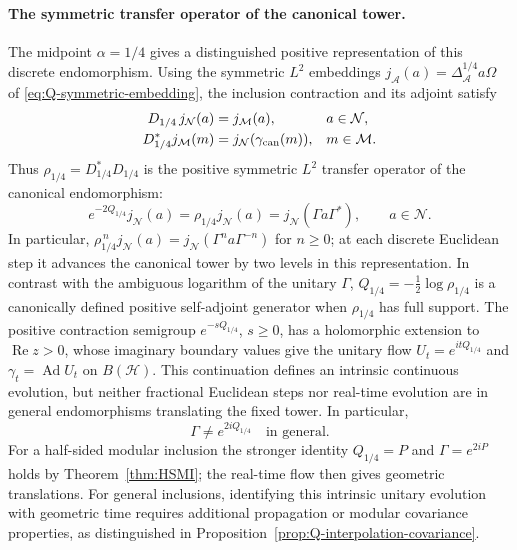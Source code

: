 \documentclass[a4paper,11pt]{article}
\theoremstyle{definition}
\newcommand{\mA}{\mathcal{A}}%
\newcommand{\mN}{\mathcal{N}}
\newcommand{\mH}{\mathcal{H}}
\newcommand{\mM}{\mathcal{M}}
\begin{document}
\paragraph{The symmetric transfer operator of the canonical tower.}
The midpoint $\alpha=1/4$ gives a distinguished positive representation
of this discrete endomorphism. Using the symmetric $L^2$ embeddings
$j_{\mA}(a)=\Delta_{\mA}^{1/4}a\Omega$ of
\eqref{eq:Q-symmetric-embedding}, the inclusion contraction and its
adjoint satisfy
\begin{equation}
 \begin{aligned}
 D_{1/4}\,j_{\mN}(a)&=j_{\mM}(a),&&a\in\mN,\\
 D_{1/4}^*j_{\mM}(m)&=j_{\mN}(\gamma_{\rm can}(m)),&&m\in\mM.
 \end{aligned}
 \label{eq:canonical-L2-adjoint}
\end{equation}
Thus $\rho_{1/4}=D_{1/4}^*D_{1/4}$ is the positive symmetric
$L^2$ transfer operator of the canonical endomorphism:
\begin{equation}
 \boxed{\quad
 e^{-2Q_{1/4}}j_{\mN}(a)
 =\rho_{1/4}j_{\mN}(a)
 =j_{\mN}(\Gamma a\Gamma^*),\qquad a\in\mN.\quad}
 \label{eq:canonical-L2-transfer}
\end{equation}
In particular, $\rho_{1/4}^{\,n}j_{\mN}(a)
=j_{\mN}(\Gamma^n a\Gamma^{-n})$ for $n\geq0$; at each discrete
Euclidean step it advances the canonical tower by two levels in this
representation. In contrast with the ambiguous logarithm of the unitary
$\Gamma$, $Q_{1/4}=-\tfrac12\log\rho_{1/4}$ is a canonically defined
positive self-adjoint generator when $\rho_{1/4}$ has full support.
The positive contraction semigroup $e^{-sQ_{1/4}}$, $s\geq0$,
has a holomorphic extension to $\operatorname{Re}z>0$, whose imaginary
boundary values give the unitary flow $U_t=e^{itQ_{1/4}}$ and
$\gamma_t=\operatorname{Ad}U_t$ on $B(\mH)$.
This continuation defines an intrinsic continuous evolution, but
neither fractional Euclidean steps nor real-time evolution are
in general endomorphisms translating the fixed tower. In particular,
\begin{equation}
 \Gamma\ne e^{2iQ_{1/4}}
 \quad\text{in general}.
 \label{eq:canonical-not-unitary-interpolation}
\end{equation}
For a half-sided modular inclusion the stronger identity
$Q_{1/4}=P$ and $\Gamma=e^{2iP}$ holds by
Theorem~\ref{thm:HSMI}; the real-time flow then gives geometric
translations. For general inclusions, identifying this intrinsic
unitary evolution with geometric time requires additional propagation
or modular covariance properties, as distinguished in
Proposition~\ref{prop:Q-interpolation-covariance}.
\end{document}
